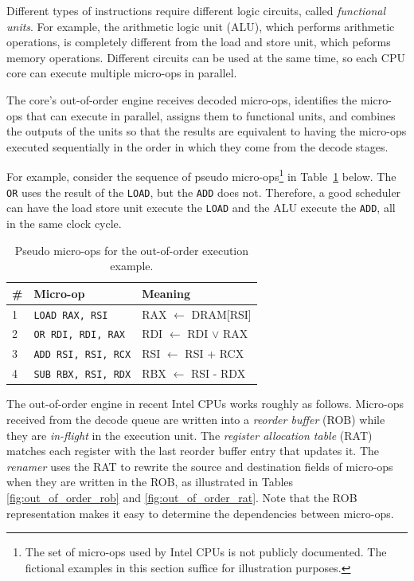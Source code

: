
Different types of instructions require different logic circuits, called
\textit{functional units}. For example, the arithmetic logic unit (ALU), which
performs arithmetic operations, is completely different from the load and store
unit, which peforms memory operations. Different circuits can be used at the
same time, so each CPU core can execute multiple micro-ops in parallel.

The core's out-of-order engine receives decoded micro-ops, identifies the
micro-ops that can execute in parallel, assigns them to functional units, and
combines the outputs of the units so that the results are equivalent to having
the micro-ops executed sequentially in the order in which they come from the
decode stages.

For example, consider the sequence of pseudo micro-ops\footnote{The set of
micro-ops used by Intel CPUs is not publicly documented. The fictional examples
in this section suffice for illustration purposes.} in
Table~\ref{fig:out_of_order_micro_ops} below. The \texttt{OR} uses the result
of the \texttt{LOAD}, but the \texttt{ADD} does not. Therefore, a good
scheduler can have the load store unit execute the \texttt{LOAD} and the ALU
execute the \texttt{ADD}, all in the same clock cycle.

\begin{table}[hbt]
  \centering
  \begin{tabular}{| l | l | l |}
  \hline
  \textbf{\#} & \textbf{Micro-op} & \textbf{Meaning}\\
  \hline
  1 & \texttt{LOAD RAX, RSI} & RAX $\leftarrow$ DRAM[RSI]\\
  \hline
  2 & \texttt{OR RDI, RDI, RAX} & RDI $\leftarrow$ RDI $\lor$ RAX\\
  \hline
  3 & \texttt{ADD RSI, RSI, RCX} & RSI $\leftarrow$ RSI + RCX\\
  \hline
  4 & \texttt{SUB RBX, RSI, RDX} & RBX $\leftarrow$ RSI - RDX\\
  \hline
  \end{tabular}
  \caption{
    Pseudo micro-ops for the out-of-order execution example.
  }
  \label{fig:out_of_order_micro_ops}
\end{table}


The out-of-order engine in recent Intel CPUs works roughly as follows.
Micro-ops received from the decode queue are written into a \textit{reorder
buffer} (ROB) while they are \textit{in-flight} in the execution unit. The
\textit{register allocation table} (RAT) matches each register with the last
reorder buffer entry that updates it. The \textit{renamer} uses the RAT to
rewrite the source and destination fields of micro-ops when they are written in
the ROB, as illustrated in Tables \ref{fig:out_of_order_rob} and
\ref{fig:out_of_order_rat}. Note that the ROB representation makes it easy to
determine the dependencies between micro-ops.

